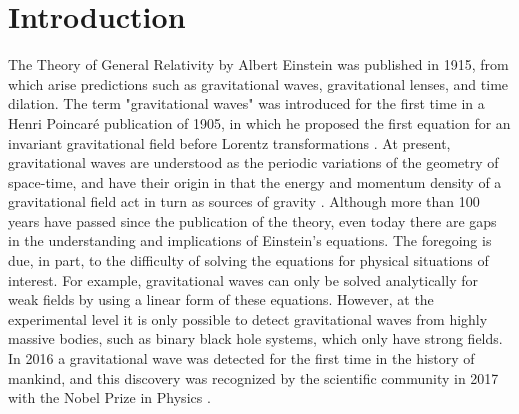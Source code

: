 
%




\chapter{Introduction}
	The Theory of General Relativity by Albert Einstein was published in 1915, from which arise predictions such as gravitational waves, gravitational lenses, and time dilation. The term "gravitational waves" was introduced for the first time in a Henri Poincaré publication of 1905, in which he proposed the first equation for an invariant gravitational field before Lorentz transformations \cite{straumann2012general, bassan2014advanced}. At present, gravitational waves are understood as the periodic variations of the geometry of space-time, and have their origin in that the energy and momentum density of a gravitational field act in turn as sources of gravity \cite{hoyng2006gravitational}. Although more than 100 years have passed since the publication of the theory, even today there are gaps in the understanding and implications of Einstein's equations. The foregoing is due, in part, to the difficulty of solving the equations for physical situations of interest. For example, gravitational waves can only be solved analytically for weak fields by using a linear form of these equations. However, at the experimental level it is only possible to detect gravitational waves from highly massive bodies, such as binary black hole systems, which only have strong fields. In 2016 a gravitational wave was detected for the first time in the history of mankind, and this discovery was recognized by the scientific community in 2017 with the Nobel Prize in Physics \cite{brugmann2018fundamentals}.
	
